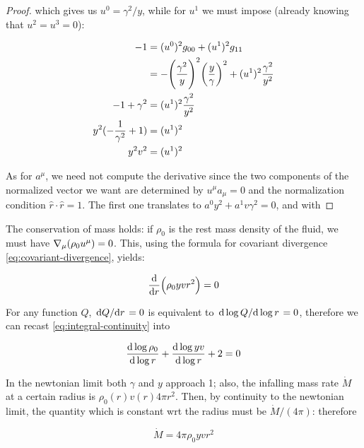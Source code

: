 \documentclass[main.tex]{subfiles}
\begin{document}
\begin{proof}
    which gives us \(u^0 = \gamma^2 / y\), while for \(u^1\) we must impose (already knowing that \(u^2 = u^3 = 0\)):

    \begin{subequations}
    \begin{align}
      -1 &= (u^0)^2 g_{00} + (u^1)^2 g_{11} \\
      &= -\qty(\frac{\gamma^2}{y})^2 \qty(\frac{y}{\gamma} )^2 + (u^1)^2 \frac{\gamma^2}{y^2} \\
      -1 + \gamma^2 &= (u^1)^2 \frac{\gamma^2}{y^2} \\
      y^2 (-\frac{1}{\gamma^2}  + 1) &= (u^1)^2 \\
      y^2 v^2 &= (u^1)^2
    \end{align}
    \end{subequations}

    As for \(a^\mu\), we need not compute the derivative since the two components of the normalized vector we want are determined by \(u^\mu a_\mu = 0\) and the normalization condition \(\hat{r} \cdot \hat{r} = 1\). The first one translates to \(a^0 y^2 + a^1 v \gamma^2 = 0\), and with
\end{proof}

The conservation of mass holds: if $\rho_0$ is the rest mass density of the fluid, we must have $\nabla_\mu \qty(\rho_0 u^\mu) =0$. This, using the formula for covariant divergence \eqref{eq:covariant-divergence}, yields:

\begin{equation} \label{eq:integral-continuity}
    \dv{}{r} \qty(\rho_0 yvr^2) = 0
\end{equation}

For any function \(Q\),  \(\dv*{Q}{r} = 0\) is equivalent to \(\dv*{\log Q }{\log r} = 0 \), therefore we can recast \eqref{eq:integral-continuity} into

\begin{equation} \label{eq:differential-continuity}
  \dv{\log \rho_0}{\log r} +
  \dv{\log yv}{\log r} + 2 = 0
\end{equation}

In the newtonian limit both $\gamma$ and $y$ approach 1; also, the infalling mass rate $\Dot{M}$ at a certain radius is $\rho_0 (r) v(r) 4\pi r^2$. Then, by continuity to the newtonian limit, the quantity which is constant wrt the radius must be $\Dot{M} / (4\pi)$: therefore

\begin{equation} \label{eq:mass-conservation-integral}
  \dot{M} = 4 \pi\rho_0 yvr^2
\end{equation}
\end{document}
